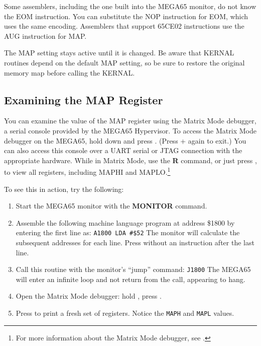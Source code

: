 Some assemblers, including the one built into the MEGA65 monitor, do not know the EOM instruction. You can substitute the NOP instruction for EOM, which uses the same encoding. Assemblers that support 65CE02 instructions use the AUG instruction for MAP.

The MAP setting stays active until it is changed. Be aware that KERNAL routines depend on the default MAP setting, so be sure to restore the original memory map before calling the KERNAL.

\subsection{Examining the MAP Register}

You can examine the value of the MAP register using the Matrix Mode debugger, a serial console provided by the MEGA65 Hypervisor. To access the Matrix Mode debugger on the MEGA65, hold down \megasymbolkey and press . (Press \megasymbolkey +  again to exit.) You can also access this console over a UART serial or JTAG connection with the appropriate hardware. While in Matrix Mode, use the {\bf R} command, or just press , to view all registers, including MAPHI and MAPLO.\footnote{For more information about the Matrix Mode debugger, see .}

To see this in action, try the following:

\begin{enumerate}
\item Start the MEGA65 monitor with the {\bf MONITOR} command.
\item Assemble the following machine language program at address \$1800 by entering the first line as: \texttt{A1800 LDA \#\$52} The monitor will calculate the subsequent addresses for each line. Press  without an instruction after the last line.


\item Call this routine with the monitor's ``jump'' command: \texttt{J1800} The MEGA65 will enter an infinite loop and not return from the call, appearing to hang.
\item Open the Matrix Mode debugger: hold \megasymbolkey, press .
\item Press  to print a fresh set of registers. Notice the \texttt{MAPH} and \texttt{MAPL} values.
\end{enumerate}

